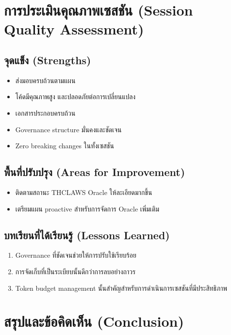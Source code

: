 \documentclass[11pt]{article}
\begin{document}
\section{การประเมินคุณภาพเซสชัน (Session Quality Assessment)}

\subsection{จุดแข็ง (Strengths)}

\begin{itemize}
    \item ส่งมอบครบถ้วนตามแผน
    \item โค้ดมีคุณภาพสูง และปลอดภัยต่อการเปลี่ยนแปลง
    \item เอกสารประกอบครบถ้วน
    \item Governance structure มั่นคงและชัดเจน
    \item Zero breaking changes ในทั้งเซสชัน
\end{itemize}

\subsection{พื้นที่ปรับปรุง (Areas for Improvement)}

\begin{itemize}
    \item ติดตามสถานะ THCLAWS Oracle ให้ละเอียดมากขึ้น
    \item เตรียมแผน proactive สำหรับการจัดการ Oracle เพิ่มเติม
\end{itemize}

\subsection{บทเรียนที่ได้เรียนรู้ (Lessons Learned)}

\begin{enumerate}
    \item Governance ที่ชัดเจนช่วยให้การปรับใช้เรียบร้อย
    \item การจัดเก็บที่เป็นระเบียบนั้นดีกว่าการลบอย่างถาวร
    \item Token budget management นั้นสำคัญสำหรับการดำเนินการเซสชันที่มีประสิทธิภาพ
\end{enumerate}

\section{สรุปและข้อคิดเห็น (Conclusion)}
\end{document}
